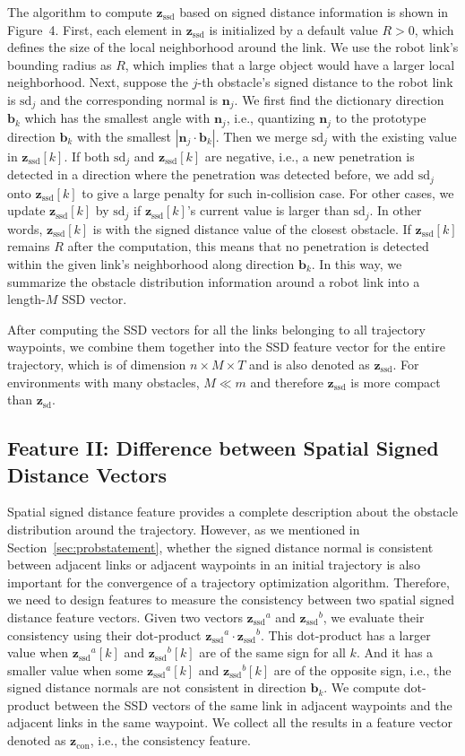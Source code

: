 \documentclass[letterpaper, 10 pt, conference]{ieeeconf}  %
\newcommand{\fsd}{\mbox{$\mathbf z_{\text{sd}}$}}
\newcommand{\fssd}{\mbox{$\mathbf z_{\text{ssd}}$}}
\newcommand{\fcon}{\mbox{$\mathbf z_{\text{con}}$}}
\begin{document}
The algorithm to compute $\fssd$ based on signed distance information is shown in Figure~4. First, each element in $\fssd$ is initialized by a default value $R > 0$, which defines the size of the local neighborhood around the link. We use the robot link's bounding radius as $R$, which implies that a large object would have a larger local neighborhood. Next, suppose the $j$-th obstacle's signed distance to the robot link is $\text{sd}_j$ and the corresponding normal is $\mathbf n_j$. We first find the dictionary direction $\mathbf b_k$ which has the smallest angle with $\mathbf n_j$, i.e., quantizing $\mathbf n_j$ to the prototype direction $\mathbf b_k$ with the smallest $|\mathbf n_j \cdot \mathbf b_k|$. Then we merge $\text{sd}_j$ with the existing value in $\fssd[k]$. If both $\text{sd}_j$ and $\fssd[k]$ are negative, i.e., a new penetration is detected in a direction where the penetration was detected before, we add $\text{sd}_j$ onto $\fssd[k]$ to give a large penalty for such in-collision case. For other cases, we update $\fssd[k]$ by $\text{sd}_j$ if $\fssd[k]$'s current value is larger than $\text{sd}_j$. In other words, $\fssd[k]$ is with the signed distance value of the closest obstacle. If $\fssd[k]$ remains $R$ after the computation, this means that no penetration is detected within the given link's neighborhood along direction $\mathbf b_k$. In this way, we summarize the obstacle distribution information around a robot link into a length-$M$ SSD vector.

After computing the SSD vectors for all the links belonging to all trajectory waypoints, we combine them together into the SSD feature vector for the entire trajectory, which is of dimension $n\times M \times T$ and is also denoted as $\fssd$. For environments with many obstacles, $M \ll m$ and therefore $\fssd$ is more compact than $\fsd$.



\subsection{Feature II: Difference between Spatial Signed Distance Vectors}
Spatial signed distance feature provides a complete description about the obstacle distribution around the trajectory. However, as we mentioned in Section~\ref{sec:probstatement}, whether the signed distance normal is consistent between adjacent links or adjacent waypoints in an initial trajectory is also important for the convergence of a trajectory optimization algorithm. Therefore, we need to design features to measure the consistency between two spatial signed distance feature vectors. Given two vectors $\fssd^a$ and $\fssd^b$, we evaluate their consistency using their dot-product $\fssd^a \cdot \fssd^b$. This dot-product has a larger value when $\fssd^a[k]$ and $\fssd^b[k]$ are of the same sign for all $k$. And it has a smaller value when some $\fssd^a[k]$ and $\fssd^b[k]$ are of the opposite sign, i.e., the signed distance normals are not consistent in direction $\mathbf b_k$. We compute dot-product between the SSD vectors of the same link in adjacent waypoints and the adjacent links in the same waypoint. We collect all the results in a feature vector denoted as $\fcon$, i.e., the consistency feature.
\end{document}
